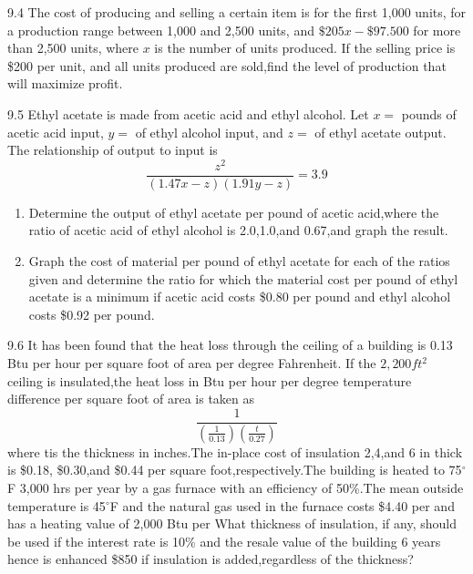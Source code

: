 \begin{exsol@solution}{}
\end{exsol@solution}
\begin{exsol@exercise}{9.4}
    \label{sea-9-4}
        The cost of producing and selling a certain item is for the first 1,000 units, for a production range between 1,000 and 2,500 units, and $\$205x-\$97.500$ for more than 2,500 units, where $x$ is the number of units produced. If the selling price is \$200 per unit, and all units produced are sold,find the level of production that will maximize profit.
\end{exsol@exercise}
\begin{exsol@solution}{}
\end{exsol@solution}
\begin{exsol@exercise}{9.5}
    \label{sea-9-5}
        Ethyl acetate is made from acetic acid and ethyl alcohol. Let $x=$ pounds of acetic acid input, $y=$ of ethyl alcohol input, and $z=$ of ethyl acetate output. The relationship of output to input is
        \begin{equation}
            \frac{z^2}{(1.47x-z)(1.91y-z)}=3.9
        \end{equation}
        \begin{enumerate}[label=\alph*)]
            \item Determine the output of ethyl acetate per pound of acetic acid,where the ratio of acetic acid of ethyl alcohol is 2.0,1.0,and 0.67,and graph the result.
            \item Graph the cost of material per pound of ethyl acetate for each of the ratios given and determine the ratio for which the material cost per pound of ethyl acetate is a minimum if acetic acid costs \$0.80 per pound and ethyl alcohol costs \$0.92 per pound.
        \end{enumerate}
\end{exsol@exercise}
\begin{exsol@solution}{}
\end{exsol@solution}
\begin{exsol@exercise}{9.6}
    \label{sea-9-6}
        It has been found that the heat loss through the ceiling of a building is 0.13 Btu per hour per square foot of area per degree Fahrenheit. If the $2,200ft^2$ ceiling is insulated,the heat loss in Btu per hour per degree temperature difference per square foot of area is taken as
        \begin{equation}
            \frac{1}{(\frac{1}{0.13})(\frac{t}{0.27})}
        \end{equation}
        where tis the thickness in inches.The in-place cost of insulation 2,4,and 6 in thick is \$0.18, \$0.30,and \$0.44 per square foot,respectively.The building is heated to 75$^{\circ}$F 3,000 hrs per year by a gas furnace with an efficiency of 50\%.The mean outside temperature is 45$^{\circ}$F and the natural gas used in the furnace costs \$4.40 per and has a heating value of 2,000 Btu per What thickness of insulation, if any, should be used if the interest rate is 10\% and the resale value of the building 6 years hence is enhanced \$850 if insulation is added,regardless of the thickness?
\end{exsol@exercise}
